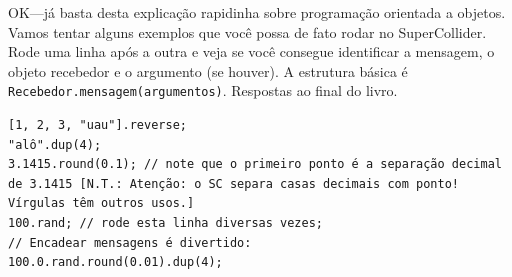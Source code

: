 OK---já basta desta explicação rapidinha sobre programação orientada a objetos. Vamos tentar alguns exemplos que você possa de fato rodar no SuperCollider. Rode uma linha após a outra e veja se você consegue identificar a mensagem, o objeto recebedor e o argumento (se houver). A estrutura básica é \texttt{Recebedor.mensagem(argumentos)}. Respostas ao final do livro.

 
\begin{lstlisting}[style=SuperCollider-IDE, basicstyle=\scttfamily\footnotesize]
[1, 2, 3, "uau"].reverse;
"alô".dup(4); 
3.1415.round(0.1); // note que o primeiro ponto é a separação decimal de 3.1415 [N.T.: Atenção: o SC separa casas decimais com ponto! Vírgulas têm outros usos.]
100.rand; // rode esta linha diversas vezes;
// Encadear mensagens é divertido:
100.0.rand.round(0.01).dup(4);
\end{lstlisting}
